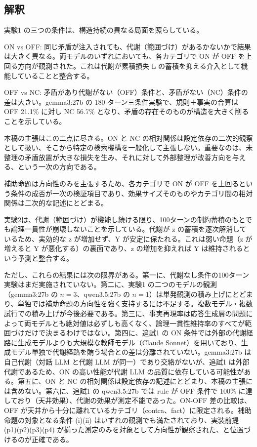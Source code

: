 \documentclass[12pt,a4paper]{article}
\begin{document}
\subsection{解釈}\label{ux89e3ux91c8}

実験1 の三つの条件は、構造持続の異なる局面を照らしている。

ON vs OFF: 同じ矛盾が注入されても、代謝（範囲づけ）があるかないかで結果は大きく異なる。両モデルのいずれにおいても、各カテゴリで ON が OFF を上回る方向が観測された。これは代謝が累積損失 L の蓄積を抑える介入として機能していることと整合する。

OFF vs NC: 矛盾があり代謝がない（OFF）条件と、矛盾がない（NC）条件の差は大きい。gemma3:27b の 180 ターン三条件実験で、規則＋事実の合算は OFF 21.1\% に対し NC 56.7\% となり、矛盾の存在そのものが構造を大きく削ることを示している。

本稿の主張はこの二点に尽きる。ON と NC の相対関係は設定依存の二次的観察として扱い、そこから特定の検索機構を一般化して主張しない。重要なのは、未整理の矛盾放置が大きな損失を生み、それに対して外部整理が改善方向を与える、という一次の方向である。

補助命題は方向性のみを主張するため、各カテゴリで ON が OFF を上回るという条件の成否が一次の検証項目であり、効果サイズそのものやカテゴリ間の相対関係は二次的な記述にとどまる。

実験2は、代謝（範囲づけ）が機能し続ける限り、100ターンの制約蓄積のもとでも論理一貫性が崩壊しないことを示している。代謝が z の蓄積を逐次解消しているため、実効的な z が増加せず、Y が安定に保たれる。これは弱い命題（z が増えると Y が悪化する）の裏面であり、z の増加を抑えれば Y は維持されるという予測と整合する。

ただし、これらの結果には次の限界がある。第一に、代謝なし条件の100ターン実験はまだ実施されていない。第二に、実験1 の二つのモデルの観測（gemma3:27b の \(n=3\)、qwen3.5:27b の \(n=1\)）は単発観測の積み上げにとどまり、単独では補助命題の方向性を強く支持するには不足する。複数モデル・複数試行での積み上げが今後必要である。第三に、事実再現率は応答生成層の問題によって両モデルとも絶対値は必ずしも高くなく、論理一貫性維持率のすべてが範囲づけだけで決まるわけではない。第四に、追試1 の ON 条件では外部の代謝経路に生成モデルよりも大規模な教師モデル（Claude Sonnet）を用いており、生成モデル単独で代謝経路を賄う場合との差は分離されていない。gemma3:27b は自己代謝（対話 LLM と代謝 LLM が同一）であり交絡がないが、追試1 は外部代謝であるため、ON の高い性能が代謝 LLM の品質に依存している可能性がある。第五に、ON と NC の相対関係は設定依存の記述にとどまり、本稿の主張には含めない。第六に、追試1 の qwen3.5:27b では rule が OFF 条件で 100\% に達しており（天井効果）、代謝の効果が測定不能であった。ON-OFF 差の比較は、OFF が天井から十分に離れているカテゴリ（contra、fact）に限定される。補助命題の対象となる条件 (i)(ii) はいずれの観測でも満たされており、実装前提 (p1)(p2)(p3)(p4) が揃った測定のみを対象として方向性が観察された、と位置づけるのが正確である。
\end{document}
